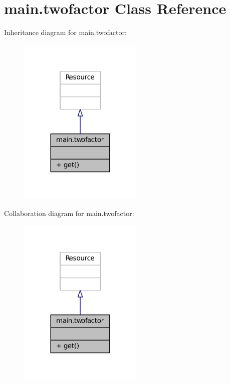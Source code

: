\hypertarget{classmain_1_1twofactor}{}\section{main.\+twofactor Class Reference}
\label{classmain_1_1twofactor}


Inheritance diagram for main.\+twofactor\+:
\nopagebreak
\begin{figure}[H]
\begin{center}
\leavevmode
\includegraphics[width=168pt]{classmain_1_1twofactor__inherit__graph}
\end{center}
\end{figure}


Collaboration diagram for main.\+twofactor\+:
\nopagebreak
\begin{figure}[H]
\begin{center}
\leavevmode
\includegraphics[width=168pt]{classmain_1_1twofactor__coll__graph}
\end{center}
\end{figure}
